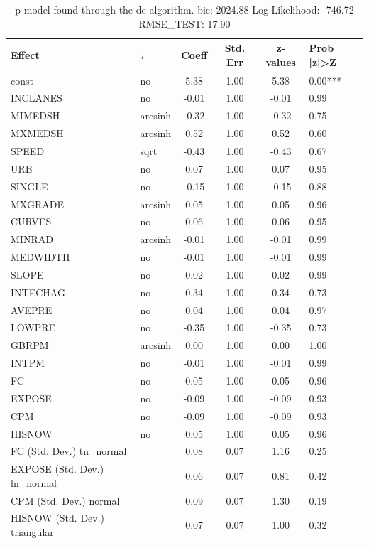 \begin{table}
	\caption{p model found through the de algorithm. bic: 2024.88 Log-Likelihood: -746.72 RMSE_TEST: 17.90}
	\begin{center}
		\begin{tabular}{|l|l|c|c|c|l|}
			\hline
			Effect & $\tau$ & Coeff & Std. Err & z-values & Prob |z|>Z \\
			\hline
			const & no & 5.38 & 1.00 & 5.38 & 0.00*** \\
			\hline
			INCLANES & no & -0.01 & 1.00 & -0.01 & 0.99 \\
			\hline
			MIMEDSH & arcsinh & -0.32 & 1.00 & -0.32 & 0.75 \\
			\hline
			MXMEDSH & arcsinh & 0.52 & 1.00 & 0.52 & 0.60 \\
			\hline
			SPEED & sqrt & -0.43 & 1.00 & -0.43 & 0.67 \\
			\hline
			URB & no & 0.07 & 1.00 & 0.07 & 0.95 \\
			\hline
			SINGLE & no & -0.15 & 1.00 & -0.15 & 0.88 \\
			\hline
			MXGRADE & arcsinh & 0.05 & 1.00 & 0.05 & 0.96 \\
			\hline
			CURVES & no & 0.06 & 1.00 & 0.06 & 0.95 \\
			\hline
			MINRAD & arcsinh & -0.01 & 1.00 & -0.01 & 0.99 \\
			\hline
			MEDWIDTH & no & -0.01 & 1.00 & -0.01 & 0.99 \\
			\hline
			SLOPE & no & 0.02 & 1.00 & 0.02 & 0.99 \\
			\hline
			INTECHAG & no & 0.34 & 1.00 & 0.34 & 0.73 \\
			\hline
			AVEPRE & no & 0.04 & 1.00 & 0.04 & 0.97 \\
			\hline
			LOWPRE & no & -0.35 & 1.00 & -0.35 & 0.73 \\
			\hline
			GBRPM & arcsinh & 0.00 & 1.00 & 0.00 & 1.00 \\
			\hline
			INTPM & no & -0.01 & 1.00 & -0.01 & 0.99 \\
			\hline
			FC & no & 0.05 & 1.00 & 0.05 & 0.96 \\
			\hline
			EXPOSE & no & -0.09 & 1.00 & -0.09 & 0.93 \\
			\hline
			CPM & no & -0.09 & 1.00 & -0.09 & 0.93 \\
			\hline
			HISNOW & no & 0.05 & 1.00 & 0.05 & 0.96 \\
			\hline
			FC (Std. Dev.) tn_normal &  & 0.08 & 0.07 & 1.16 & 0.25 \\
			\hline
			EXPOSE (Std. Dev.) ln_normal &  & 0.06 & 0.07 & 0.81 & 0.42 \\
			\hline
			CPM (Std. Dev.) normal &  & 0.09 & 0.07 & 1.30 & 0.19 \\
			\hline
			HISNOW (Std. Dev.) triangular &  & 0.07 & 0.07 & 1.00 & 0.32 \\
			\hline
		\end{tabular}
	\end{center}
\end{table}